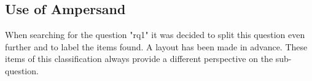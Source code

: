 \subsection{Use of Ampersand}\label{use_of_ampersand}
When searching for the question "\acrlong{rq1}" it was decided to split this question even further and to label the items found.
A layout has been made in advance.
These items of this classification always provide a different perspective on the sub-question.
\begin{comment}
When asking questions about the knowledge required in the role of software engineers to be able to use Ampersand, the focus is not only on the Ampersand method itself.
We must also ask ourselves whether, in addition to Ampersand, knowledge of the underlying theory on which Ampersand is based is also required.
Is it necessary to know relationship algebra.
The environment in which a prototype runs also plays a role.
This includes browser settings and the use of containers (Docker) in which Ampersand runs.
During development we are dealing with an \acrfull{ide}.
The use of such a \acrshort{ide} for determining the usability of Ampersand is relevant.
Internet support is now indispensable when creating the scripts.
Scripting for Ampersand also requires support for web search capabilities.
But can this be found for a relatively unknown method like Ampersand?
Finally, we look at output produced by method.
Is it true that how the method is used also determines what comes out?
This applies to both the prototype and the generated documentation.
Subsequently, the approach to this process, the use of the method, among other things, determines the result.
These aspects will be discussed in the following paragraphs.
The sub-questions can be further subdivided into small parts.
Starting from the question "\acrlong{rq1}", the question then follows which observations relate to this knowledge.
Is it knowledge about only Ampersand or is knowledge also required of relation algebra.
By working with Ampersand, we are also confronted with the environment in which we develop it.
Ampersand stands alone as a language, but in use there are development tools like \acrlong{vsc} in this case.
To run it, you need a Docker container.
That is at least the implementation as the \acrlong{ou} provides.
During the development phase, examples are searched on the internet.
And these are generally easy to find, is that also the case at Ampersand?
Ampersand also provides documentation and a prototype.
Here too, knowledge of Ampersand is required.
Finally, you also have to ask yourself whether the way Ampersand is used, the approach to the project, also requires knowledge of Ampersand.
There are a number of angles that play around Ampersand's knowledge.
\end{comment}


